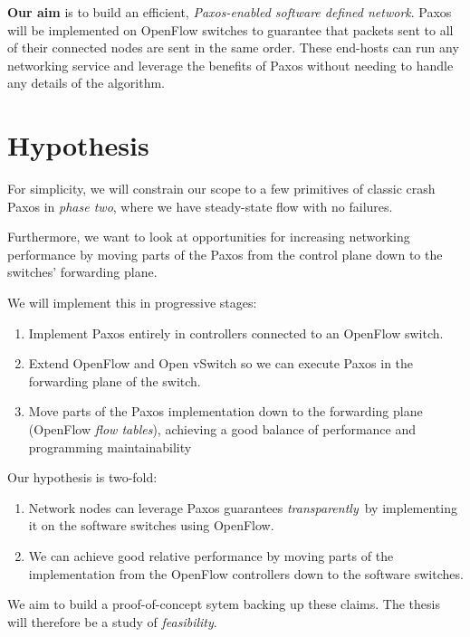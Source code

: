 \textbf{Our aim} is to build an efficient, \textit{Paxos-enabled software defined
network}.  Paxos will be implemented on OpenFlow switches to guarantee that
packets sent to all of their connected nodes are sent in the same order.
These end-hosts can run any networking service and leverage the benefits of
Paxos without needing to handle any details of the algorithm.

\section{Hypothesis}

For simplicity, we will constrain our scope to a few primitives of
classic crash Paxos in \textit{phase two},
where we have steady-state
flow with no failures.

Furthermore, we want to look at opportunities for increasing networking
performance by moving parts of the Paxos from the control
plane down to the switches' forwarding
plane.

We will implement this in progressive stages:

\begin{enumerate}
  \item Implement Paxos entirely in controllers connected to an OpenFlow
  switch.

  \item Extend OpenFlow and Open vSwitch so we can execute Paxos in the
  forwarding plane of the switch.

  \item Move parts of the Paxos implementation down to the forwarding plane
  (OpenFlow \textit{flow tables}), achieving a good balance of performance and
  programming maintainability
\end{enumerate}

Our hypothesis is two-fold:

\begin{enumerate}
\item Network nodes can leverage Paxos guarantees \textit{transparently} by
implementing it on the software switches using OpenFlow.
\item We can achieve good relative performance by moving parts of the
implementation from the OpenFlow controllers down to the software switches.
\end{enumerate}

We aim to build a proof-of-concept sytem backing up these claims.  The
thesis will therefore be a study of \textit{feasibility}.


